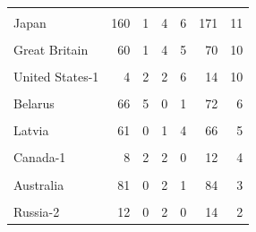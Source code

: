 \documentclass[
]{article}
\begin{document}
\begin{table}[H]
\begin{tabular}[t]{lrrrrrr}
\cellcolor{gray!10}{Czech Republic} & \cellcolor{gray!10}{168} & \cellcolor{gray!10}{2} & \cellcolor{gray!10}{7} & \cellcolor{gray!10}{2} & \cellcolor{gray!10}{179} & \cellcolor{gray!10}{11}\\
\addlinespace
Japan & 160 & 1 & 4 & 6 & 171 & 11\\
\cellcolor{gray!10}{Poland} & \cellcolor{gray!10}{138} & \cellcolor{gray!10}{4} & \cellcolor{gray!10}{4} & \cellcolor{gray!10}{3} & \cellcolor{gray!10}{149} & \cellcolor{gray!10}{11}\\
Great Britain & 60 & 1 & 4 & 5 & 70 & 10\\
\cellcolor{gray!10}{Russia-1} & \cellcolor{gray!10}{4} & \cellcolor{gray!10}{8} & \cellcolor{gray!10}{0} & \cellcolor{gray!10}{2} & \cellcolor{gray!10}{14} & \cellcolor{gray!10}{10}\\
United States-1 & 4 & 2 & 2 & 6 & 14 & 10\\
\addlinespace
\cellcolor{gray!10}{Slovenia} & \cellcolor{gray!10}{108} & \cellcolor{gray!10}{2} & \cellcolor{gray!10}{2} & \cellcolor{gray!10}{4} & \cellcolor{gray!10}{116} & \cellcolor{gray!10}{8}\\
Belarus & 66 & 5 & 0 & 1 & 72 & 6\\
\cellcolor{gray!10}{Latvia-1} & \cellcolor{gray!10}{2} & \cellcolor{gray!10}{0} & \cellcolor{gray!10}{4} & \cellcolor{gray!10}{2} & \cellcolor{gray!10}{8} & \cellcolor{gray!10}{6}\\
Latvia & 61 & 0 & 1 & 4 & 66 & 5\\
\cellcolor{gray!10}{Ukraine} & \cellcolor{gray!10}{96} & \cellcolor{gray!10}{4} & \cellcolor{gray!10}{0} & \cellcolor{gray!10}{1} & \cellcolor{gray!10}{101} & \cellcolor{gray!10}{5}\\
\addlinespace
Canada-1 & 8 & 2 & 2 & 0 & 12 & 4\\
\cellcolor{gray!10}{Germany-1} & \cellcolor{gray!10}{10} & \cellcolor{gray!10}{2} & \cellcolor{gray!10}{0} & \cellcolor{gray!10}{2} & \cellcolor{gray!10}{14} & \cellcolor{gray!10}{4}\\
Australia & 81 & 0 & 2 & 1 & 84 & 3\\
\cellcolor{gray!10}{Austria-1} & \cellcolor{gray!10}{0} & \cellcolor{gray!10}{0} & \cellcolor{gray!10}{2} & \cellcolor{gray!10}{0} & \cellcolor{gray!10}{2} & \cellcolor{gray!10}{2}\\
Russia-2 & 12 & 0 & 2 & 0 & 14 & 2\\
\bottomrule
\end{tabular}
\end{table}
\end{document}

